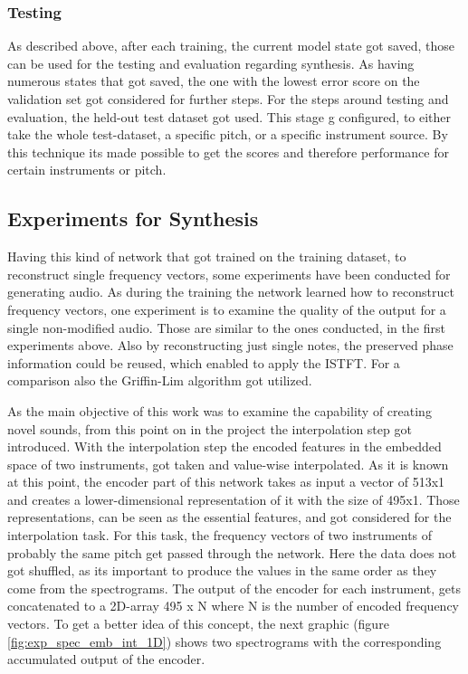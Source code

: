 \subsubsection{Testing}
As described above, after each training, the current model state got saved, those can be used for the testing and evaluation regarding synthesis. As having numerous states that got saved, the one with the lowest error score on the validation set got considered for further steps. For the steps around testing and evaluation, the held-out test dataset got used. This stage g configured, to either take the whole test-dataset, a specific pitch, or a specific instrument source. By this technique its made possible to get the scores and therefore performance for certain instruments or pitch. 

\subsection{Experiments for Synthesis}
Having this kind of network that got trained on the training dataset, to reconstruct single frequency vectors, some experiments have been conducted for generating audio. As during the training the network learned how to reconstruct frequency vectors, one experiment is to examine the quality of the output for a single non-modified audio. Those are similar to the ones conducted, in the first experiments above. Also by reconstructing just single notes, the preserved phase information could be reused, which enabled to apply the ISTFT. For a comparison also the Griffin-Lim algorithm got utilized.

As the main objective of this work was to examine the capability of creating novel sounds, from this point on in the project the interpolation step got introduced. With the interpolation step the encoded features in the embedded space of two instruments, got taken and value-wise interpolated. As it is known at this point, the encoder part of this network takes as input a vector of 513x1 and creates a lower-dimensional representation of it with the size of 495x1. Those representations, can be seen as the essential features, and got considered for the interpolation task. For this task, the frequency vectors of two instruments of probably the same pitch get passed through the network. Here the data does not got shuffled, as its important to produce the values in the same order as they come from the spectrograms. The output of the encoder for each instrument, gets concatenated to a 2D-array 495 x N where N is the number of encoded frequency vectors. To get a better idea of this concept, the next graphic (figure \ref{fig:exp_spec_emb_int_1D}) shows two spectrograms with the corresponding accumulated output of the encoder. 

